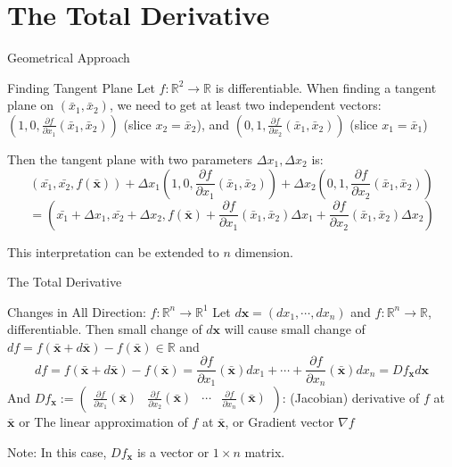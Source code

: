 \documentclass[a4paper,11pt]{article}
\newcommand{\bb}{\mathbb}
\newcommand{\bd}{\mathbf}
\newcommand{\p}{\partial}
\begin{document}
\section{The Total Derivative} %
\label{sec:the_total_derivative}

\begin{frame}[t]{Geometrical Approach}
	\begin{block}{Finding Tangent Plane}
		Let $f:\bb{R}^2\rightarrow \bb{R}$ is differentiable. When finding a tangent plane on $(\bar x_1, \bar x_2)$, we need to get at least two independent vectors: $\left(1,0,\frac{\p f}{\p x_1}(\bar x_1, \bar x_2)\right)$ (slice $x_2=\bar x_2$), and $\left(0,1,\frac{\p f}{\p x_2}(\bar x_1, \bar x_2)\right)$ (slice $x_1=\bar x_1$)

		Then the tangent plane with two parameters $\Delta x_1, \Delta x_2$ is:\[
			(\bar {x_1}, \bar{x_2}, f(\bar {\bd x})) + \Delta x_1\left(1,0,\frac{\p f}{\p x_1}(\bar x_1, \bar x_2) \right)+\Delta x_2\left(0,1,\frac{\p f}{\p x_2}(\bar x_1, \bar x_2)\right)
		\]\[
			=\left(\bar{ x_1}+\Delta x_1 , \bar{x_2}+\Delta x_2, f(\bar {\bd x})+ \frac{\p f}{\p x_1}(\bar x_1, \bar x_2)\Delta x_1 + \frac{\p f}{\p x_2}(\bar x_1, \bar x_2)\Delta x_2 \right)
		\]
	\end{block}
	This interpretation can be extended to $n$ dimension.
\end{frame}

\begin{frame}[t]{The Total Derivative}
	\begin{block}
		{Changes in All Direction: $f:\bb{R}^n\rightarrow \bb{R}^1$}
		Let $d \bd x = (d x_1, \cdots, d x_n)$ and $f:\bb{R}^n\rightarrow\bb{R}$, differentiable. Then small change of $d\bd x$ will cause small change of $df=f(\bar{\bd x} + d \bar{\bd x}) - f(\bar{\bd x})\in\bb{R}$ and \[
			df = f(\bar{\bd x} + d \bar{\bd x}) - f(\bar{\bd x}) = \frac{\p f}{\p x_1}(\bar{\bd x})dx_1 + \cdots +\frac{\p f}{\p x_n}(\bar{\bd x})dx_n= Df_{\bd x} d\bd x
		\]
		And $Df_{\bd x}:=\begin{pmatrix}
			\frac{\p f}{\p x_1}(\bar{\bd x}) & \frac{\p f}{\p x_2}(\bar{\bd x}) &\cdots & \frac{\p f}{\p x_n}(\bar{\bd x})
		\end{pmatrix}$: (Jacobian) derivative of $f$ at $\bar{\bd x}$ or The linear approximation of $f$ at $\bar{\bd x}$, or Gradient vector $\nabla f$
	\end{block}
	Note: In this case, $Df_{\bd x}$ is a vector or $1\times n$ matrix.
\end{frame}
\end{document}
